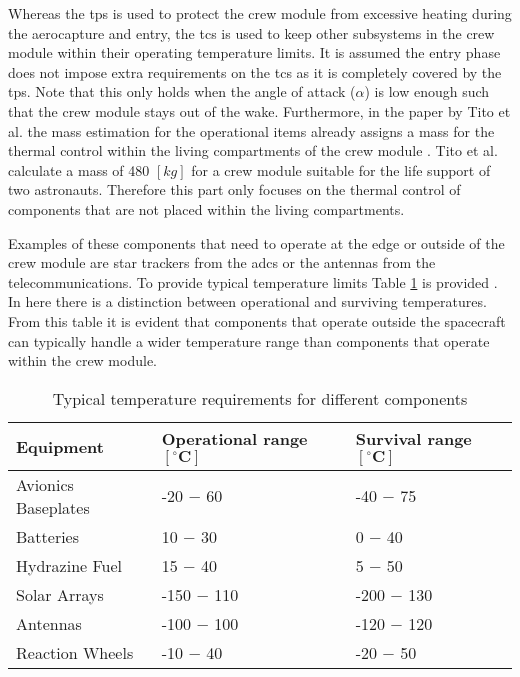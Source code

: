 Whereas the \acrfull{tps} is used to protect the crew module from excessive heating during the aerocapture and entry, the \acrfull{tcs} is used to keep other subsystems in the crew module within their operating temperature limits. It is assumed the entry phase does not impose extra requirements on the \gls{tcs} as it is completely covered by the \gls{tps}. Note that this only holds when the angle of attack ($\alpha$) is low enough such that the crew module stays out of the wake. Furthermore, in the paper by Tito et al. the mass estimation for the operational items already assigns a mass for the thermal control within the living compartments of the crew module \cite{Tito2013}. Tito et al. calculate a mass of 480 $[kg]$ for a crew module suitable for the life support of two astronauts. Therefore this part only focuses on the thermal control of components that are not placed within the living compartments.

Examples of these components that need to operate at the edge or outside of the crew module are star trackers from the \gls{adcs} or the antennas from the telecommunications. To provide typical temperature limits Table \ref{tab:cmtherm} is provided \cite[p.686]{Wertz2011}. In here there is a distinction between operational and surviving temperatures. From this table it is evident that components that operate outside the spacecraft can typically handle a wider temperature range than components that operate within the crew module.

\begin{table}[h]
	\centering
	\caption{Typical temperature requirements for different components}
	\begin{tabular}{|l||l|l|}
		\hline
		\textbf{Equipment} & \textbf{Operational range $\mathbf{[^{\circ}C]}$} & \textbf{Survival range $\mathbf{[^{\circ}C]}$}\\ \hline \hline
		Avionics Baseplates & -20 $-$ 60 & -40 $-$ 75 \\
		Batteries & 10 $-$ 30 & 0 $-$ 40 \\
		Hydrazine Fuel & 15 $-$ 40 & 5 $-$ 50 \\
		Solar Arrays & -150 $-$ 110 & -200 $-$ 130 \\
		Antennas & -100 $-$ 100 & -120 $-$ 120 \\
		Reaction Wheels & -10 $-$ 40 & -20 $-$ 50 \\
		\hline
	\end{tabular}
	\label{tab:cmtherm}
\end{table}

